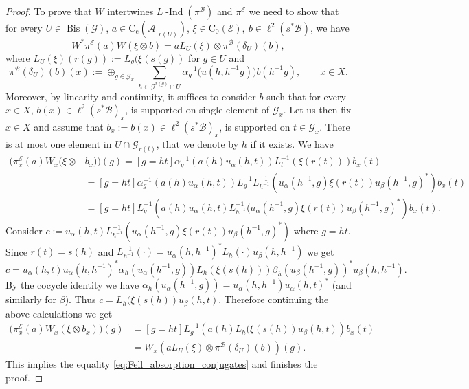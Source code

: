 \documentclass[11 pt, leqno]{amsart}
\numberwithin{equation}{section}
\theoremstyle{plain}
\theoremstyle{definition}
\newcommand*{\contc}{\mathrm{C_c}}%
\newcommand*{\contz}{\mathrm{C_0}}%
\DeclareMathOperator{\dashind}{-Ind}
\DeclareMathOperator{\Bis}{Bis}
\newcommand{\B}{\mathcal B}
\newcommand{\G}{\mathcal G} %
\newcommand{\EE}{\mathcal E}
\newcommand{\A}{\mathcal A}
\begin{document}
\begin{proof}
To prove that $W$ intertwines $L\dashind(\pi^\B)$ and $\pi^{\EE}$ we need to show that for every  $U\in \Bis(\G)$, $a\in \contc(\A|_{r(U)})$, $\xi\in \contz(\EE),\ b\in \ell^2(s^*\B)$, we have
\begin{equation}\label{eq:Fell_absorption_conjugates}
    W^*\pi^{\EE}(a)W (\xi \otimes b)= a L_U(\xi) \otimes \pi^{\B}(\delta_U)(b), 
\end{equation}
where $L_U(\xi)(r(g)):=L_{g}(\xi(s(g))$ for $g\in U$ and 
\[
    \pi^{\B}(\delta_U)(b)(x) := \oplus_{g\in \G_x} \sum_{h\in \G^{r(g)}\cap U} \overline{\alpha}_{g}^{-1}\big(u(h,h^{-1}g)\big)b(h^{-1}g), \qquad x\in X.
\]
Moreover, by linearity and continuity, it suffices to consider $b$ such that for every $x\in X$,  $b(x)\in \ell^2(s^*\B)_x$, is supported on single element of $\G_x$. 
Let us then fix $x\in X$ and assume that $b_x := b(x)\in \ell^2(s^*\B)_x$, is supported on $t\in \G_x$. 
There is at most one element in $U\cap \G_{r(t)}$, that we denote by $h$ if it exists. 
We have   
\[
\begin{split}
    \big( \pi^{\EE}_x (a) W_x (\xi\otimes & b_x) \big)(g) = [g=ht] \alpha_{g}^{-1} \left( a(h)u_{\alpha}(h,t) \right) L_{t}^{-1} \left( \xi(r(t)) \right) b_x(t) \\
        &= [g=ht] \alpha_{g}^{-1} \left( a(h) u_{\alpha}(h,t) \right) L_{g}^{-1} L_{h^{-1}}^{-1} \left( u_{\alpha}(h^{-1},g)\xi(r(t)) u_{\beta}(h^{-1},g)^* \right) b_x(t) \\
        &= [g=ht] L_{g}^{-1} \left( a(h)u_{\alpha}(h,t) L_{h^{-1}}^{-1} (u_{\alpha}(h^{-1},g)\xi(r(t)) u_{\beta}(h^{-1},g)^* \right) b_x(t).
\end{split}
\]
Consider $c:=u_{\alpha}(h,t) L_{h^{-1}}^{-1} \left( u_{\alpha}(h^{-1},g)\xi(r(t)) u_{\beta}(h^{-1},g)^* \right)$ where $g=ht$. 
Since $r(t)=s(h)$ and $L_{h^{-1}}^{-1}(\cdot) = u_{\alpha}(h,h^{-1})^* L_{h}(\cdot) u_{\beta}(h,h^{-1})$ we get
\[
    c = u_{\alpha}(h,t) u_{\alpha}(h,h^{-1})^* \alpha_h(u_{\alpha}(h^{-1},g)) L_{h}\left(\xi(s(h)) \right)\beta_{h}(u_{\beta}(h^{-1},g))^* u_{\beta}(h,h^{-1}).
\]
By the cocycle identity we have $\alpha_h(u_{\alpha}(h^{-1},g)) = u_{\alpha}(h,h^{-1})u_{\alpha}(h,t)^*$  (and similarly for $\beta$). 
Thus $c = L_h(\xi(s(h))u_{\beta}(h,t)$. 
Therefore continuing the above calculations we get
\[
\begin{split}
    \big( \pi^{\EE}_x(a) W_x (\xi\otimes  b_x) \big)(g) &= [g=ht] L_{g}^{-1} \left( a(h) L_h ( \xi(s(h) ) u_{\beta}(h,t) \right) b_x(t) \\
        &= W_x \left( a L_U(\xi) \otimes \pi^{\B}(\delta_U)(b) \right)(g).
\end{split}
\]
This implies the equality \eqref{eq:Fell_absorption_conjugates} and finishes the proof.
\end{proof}
\end{document}
